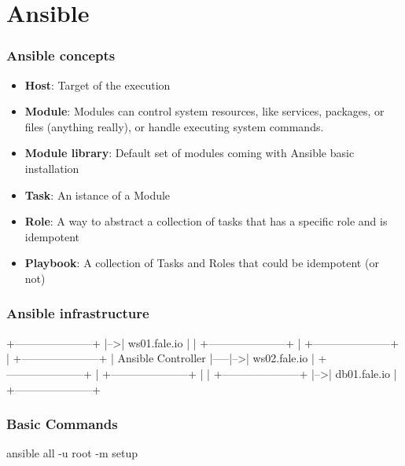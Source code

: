 \documentclass[t,aspectratio=169]{beamer}
\begin{document}
\section{Ansible}
\begin{frame}
    \frametitle{Ansible concepts}
    \begin{itemize}
        \item<2->\textbf{Host}: Target of the execution
        \item<3->\textbf{Module}: Modules can control system resources, like services, packages, or files (anything really), or handle executing system commands.
        \item<4->\textbf{Module library}: Default set of modules coming with Ansible basic installation
        \item<5->\textbf{Task}: An istance of a Module 
        \item<6->\textbf{Role}: A way to abstract a collection of tasks that has a specific role and is idempotent
        \item<7->\textbf{Playbook}: A collection of Tasks and Roles that could be idempotent (or not)
    \end{itemize}
\end{frame}

\begin{frame}[fragile]
    \frametitle{Ansible infrastructure}
    \begin{semiverbatim}
                                +---------------------+
                            |-->|    ws01.fale.io     |
                            |   +---------------------+
                            |
+---------------------+     |   +---------------------+
| Ansible Controller  |-----|-->|    ws02.fale.io     |
+---------------------+     |   +---------------------+
                            |
                            |   +---------------------+
                            |-->|    db01.fale.io     |
                                +---------------------+
    \end{semiverbatim}
\end{frame}

\begin{frame}[fragile]
    \frametitle{Basic Commands}
    \begin{semiverbatim}
ansible all -u root -m setup
    \end{semiverbatim}
\end{frame}
\end{document}
